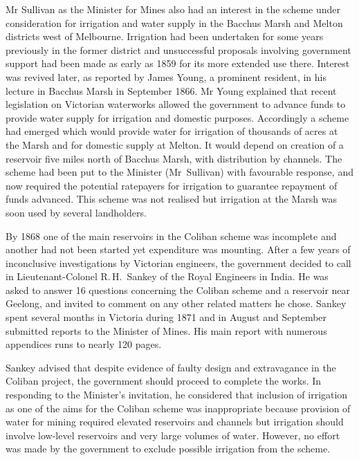Mr Sullivan as the Minister for Mines also had an interest in the
scheme under consideration for irrigation and water supply in the
Bacchus Marsh and Melton districts west of Melbourne.  Irrigation had
been undertaken for some years previously in the former district and
unsuccessful proposals involving government support had been made as
early as 1859 for its more extended use there.  Interest was revived
later, as reported by James Young, a prominent resident, in his
lecture in Bacchus Marsh in September 1866.  Mr Young explained that
recent legislation on Victorian waterworks allowed the government to
advance funds to provide water supply for irrigation and domestic
purposes.  Accordingly a scheme had emerged which would provide water
for irrigation of thousands of acres at the Marsh and for domestic
supply at Melton.  It would depend on creation of a reservoir five
miles north of Bacchus Marsh, with distribution by channels.  The
scheme had been put to the Minister (Mr~Sullivan) with favourable
response, and now required the potential ratepayers for irrigation to
guarantee repayment of funds advanced.  This scheme was not realised
but irrigation at the Marsh was soon used by several
landholders.

By 1868 one of the main reservoirs in the Coliban scheme was
incomplete and another had not been started yet expenditure was
mounting.  After a few years of inconclusive investigations by
Victorian engineers, the government decided to call in
Lieutenant-Colonel R.\,H.~Sankey of the Royal Engineers in India.  He
was asked to answer 16 questions concerning the Coliban scheme and a
reservoir near Geelong, and invited to comment on any other related
matters he chose. Sankey spent several months in Victoria during 1871
and in August and September submitted reports to the Minister of
Mines. His main report with numerous appendices runs to nearly 120
pages.

Sankey advised that despite evidence of faulty design and extravagance
in the Coliban project, the government should proceed to complete the
works.  In responding to the Minister's invitation, he considered that
inclusion of irrigation as one of the aims for the Coliban scheme was
inappropriate because provision of water for mining required elevated
reservoirs and channels but irrigation should involve low-level
reservoirs and very large volumes of water.  However, no effort was
made by the government to exclude possible irrigation from the scheme.

